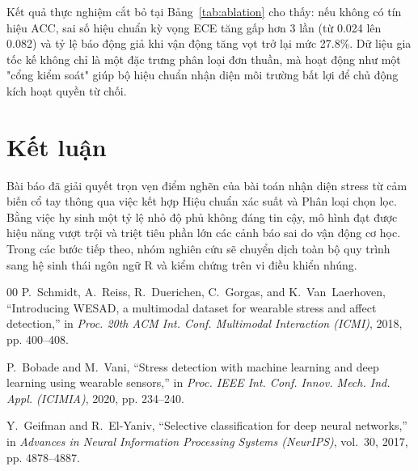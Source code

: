 \documentclass[conference]{IEEEtran}
\begin{document}
Kết quả thực nghiệm cắt bỏ tại Bảng~\ref{tab:ablation} cho thấy: nếu không có tín hiệu ACC, sai số hiệu chuẩn kỳ vọng ECE tăng gấp hơn 3 lần (từ 0.024 lên 0.082) và tỷ lệ báo động giả khi vận động tăng vọt trở lại mức 27.8\%. Dữ liệu gia tốc kế không chỉ là một đặc trưng phân loại đơn thuần, mà hoạt động như một "cổng kiểm soát" giúp bộ hiệu chuẩn nhận diện môi trường bất lợi để chủ động kích hoạt quyền từ chối.

\section{Kết luận}
Bài báo đã giải quyết trọn vẹn điểm nghẽn của bài toán nhận diện stress từ cảm biến cổ tay thông qua việc kết hợp Hiệu chuẩn xác suất và Phân loại chọn lọc. Bằng việc hy sinh một tỷ lệ nhỏ độ phủ không đáng tin cậy, mô hình đạt được hiệu năng vượt trội và triệt tiêu phần lớn các cảnh báo sai do vận động cơ học. Trong các bước tiếp theo, nhóm nghiên cứu sẽ chuyển dịch toàn bộ quy trình sang hệ sinh thái ngôn ngữ R và kiểm chứng trên vi điều khiển nhúng.

\begin{thebibliography}{00}
P.~Schmidt, A.~Reiss, R.~Duerichen, C.~Gorgas, and K.~Van~Laerhoven, ``Introducing WESAD, a multimodal dataset for wearable stress and affect detection,'' in \textit{Proc. 20th ACM Int. Conf. Multimodal Interaction (ICMI)}, 2018, pp. 400--408.

P.~Bobade and M.~Vani, ``Stress detection with machine learning and deep learning using wearable sensors,'' in \textit{Proc. IEEE Int. Conf. Innov. Mech. Ind. Appl. (ICIMIA)}, 2020, pp. 234--240.

Y.~Geifman and R.~El-Yaniv, ``Selective classification for deep neural networks,'' in \textit{Advances in Neural Information Processing Systems (NeurIPS)}, vol.~30, 2017, pp. 4878--4887.
\end{thebibliography}
\end{document}
